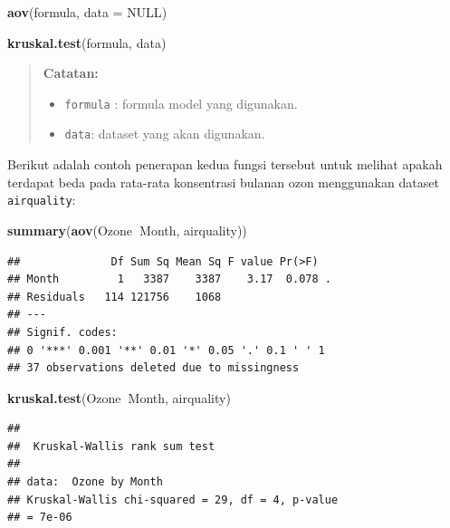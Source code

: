 \documentclass[]{book}
\newenvironment{Shaded}{\begin{snugshade}}{\end{snugshade}}
\newcommand{\DataTypeTok}[1]{\textcolor[rgb]{0.13,0.29,0.53}{#1}}
\newcommand{\KeywordTok}[1]{\textcolor[rgb]{0.13,0.29,0.53}{\textbf{#1}}}
\newcommand{\NormalTok}[1]{#1}
\newcommand{\OperatorTok}[1]{\textcolor[rgb]{0.81,0.36,0.00}{\textbf{#1}}}
\newcommand{\OtherTok}[1]{\textcolor[rgb]{0.56,0.35,0.01}{#1}}
\providecommand{\tightlist}{%
  \setlength{\itemsep}{0pt}\setlength{\parskip}{0pt}}
\theoremstyle{definition}
\theoremstyle{definition}
\theoremstyle{definition}
\theoremstyle{remark}
\begin{document}
\begin{Shaded}
\begin{Highlighting}[]
\KeywordTok{aov}\NormalTok{(formula, }\DataTypeTok{data =} \OtherTok{NULL}\NormalTok{)}

\KeywordTok{kruskal.test}\NormalTok{(formula, data)}
\end{Highlighting}
\end{Shaded}

\begin{quote}
\textbf{Catatan:}

\begin{itemize}
\tightlist
\item
  \texttt{formula} : formula model yang digunakan.
\item
  \texttt{data}: dataset yang akan digunakan.
\end{itemize}
\end{quote}

Berikut adalah contoh penerapan kedua fungsi tersebut untuk melihat apakah terdapat beda pada rata-rata konsentrasi bulanan ozon menggunakan dataset \texttt{airquality}:

\begin{Shaded}
\begin{Highlighting}[]
\KeywordTok{summary}\NormalTok{(}\KeywordTok{aov}\NormalTok{(Ozone}\OperatorTok{~}\NormalTok{Month, airquality))}
\end{Highlighting}
\end{Shaded}

\begin{verbatim}
##              Df Sum Sq Mean Sq F value Pr(>F)  
## Month         1   3387    3387    3.17  0.078 .
## Residuals   114 121756    1068                 
## ---
## Signif. codes:  
## 0 '***' 0.001 '**' 0.01 '*' 0.05 '.' 0.1 ' ' 1
## 37 observations deleted due to missingness
\end{verbatim}

\begin{Shaded}
\begin{Highlighting}[]
\KeywordTok{kruskal.test}\NormalTok{(Ozone}\OperatorTok{~}\NormalTok{Month, airquality)}
\end{Highlighting}
\end{Shaded}

\begin{verbatim}
## 
##  Kruskal-Wallis rank sum test
## 
## data:  Ozone by Month
## Kruskal-Wallis chi-squared = 29, df = 4, p-value
## = 7e-06
\end{verbatim}
\end{document}
